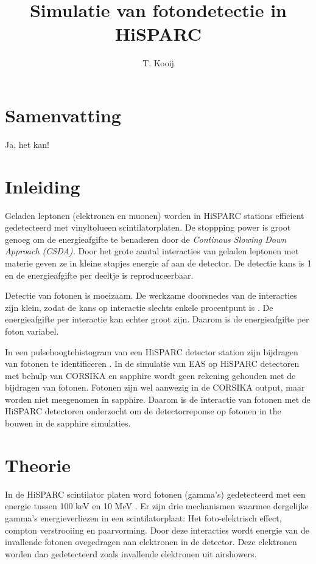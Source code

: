 \documentclass[a4paper,11pt]{article}
\author{T. Kooij}
\title{Simulatie van fotondetectie in HiSPARC}
\begin{document}
\maketitle
\tableofcontents

\section{Samenvatting}
Ja, het kan!

\section{Inleiding}
Geladen leptonen (elektronen en muonen) worden in HiSPARC stations efficient gedetecteerd met vinyltolueen scintilatorplaten. De stoppping power is groot genoeg om de energieafgifte te benaderen door de \textit{Continous Slowing Down Approach (CSDA).} Door het grote aantal interacties van geladen leptonen met materie geven ze in kleine stapjes energie af aan de detector. De detectie kans is 1 en de energieafgifte per deeltje is reproduceerbaar.

Detectie van fotonen is moeizaam. De werkzame doorsnedes van de interacties zijn klein, zodat de kans op interactie slechts enkele procentpunt is \cite*{Pennink:2010}. De energieafgifte per interactie kan echter groot zijn. Daarom is de energieafgifte per foton variabel.

In een pulsehoogtehistogram van een HiSPARC detector station zijn bijdragen van fotonen te identificeren \cite*{Pennink:2010}. In de simulatie van EAS op HiSPARC detectoren met behulp van CORSIKA en sapphire wordt geen rekening gehouden met de bijdragen van fotonen. Fotonen zijn wel aanwezig in de CORSIKA output, maar worden niet meegenomen in sapphire. Daarom is de interactie van fotonen met de HiSPARC detectoren onderzocht om de detectorreponse op fotonen in the bouwen in de sapphire simulaties.

\section{Theorie}
In de HiSPARC scintilator platen word fotonen (gamma's) gedetecteerd met een energie tussen 100 keV en 10 MeV \cite*{Steijger2010-gammas}. Er zijn drie mechanismen waarmee dergelijke gamma's energieverliezen in een scintilatorplaat: Het foto-elektrisch effect, compton verstrooiing en paarvorming. Door deze interacties wordt energie van de invallende fotonen ovegedragen aan elektronen in de detector. Deze elektronen worden dan gedetecteerd zoals invallende elektronen uit airshowers.
\end{document}

